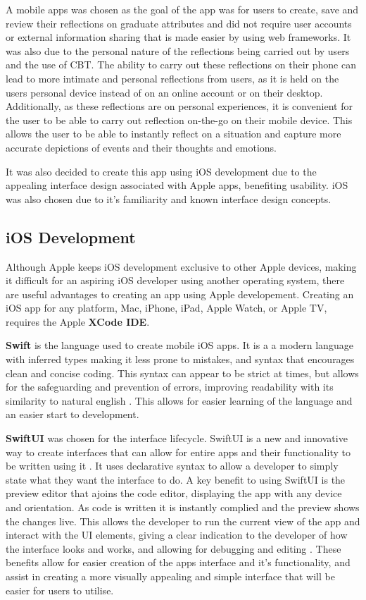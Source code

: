 \documentclass{l4proj}
\begin{document}
A mobile apps was chosen as the goal of the app was for users to create, save and review their reflections on graduate attributes and did not require user accounts or external information sharing that is made easier by using web frameworks. It was also due to the personal nature of the reflections being carried out by users and the use of CBT. The ability to carry out these reflections on their phone can lead to more intimate and personal reflections from users, as it is held on the users personal device instead of on an online account or on their desktop. Additionally, as these reflections are on personal experiences, it is convenient for the user to be able to carry out reflection on-the-go on their mobile device. This allows the user to be able to instantly reflect on a situation and capture more accurate depictions of events and their thoughts and emotions. 

It was also decided to create this app using iOS development due to the appealing interface design associated with Apple apps, benefiting usability. iOS was also chosen due to it's familiarity and known interface design concepts.

\subsection{iOS Development}

Although Apple keeps iOS development exclusive to other Apple devices, making it difficult for an aspiring iOS developer using another operating system, there are useful advantages to creating an app using Apple developement. Creating an iOS app for any platform, Mac, iPhone, iPad, Apple Watch, or Apple TV, requires the Apple \textbf{XCode IDE}. 

\textbf{Swift} is the language used to create mobile iOS apps. It is a a modern language with inferred types making it less prone to mistakes, and syntax that encourages clean and concise coding. This syntax can appear to be strict at times, but allows for the safeguarding and prevention of errors, improving readability with its similarity to natural english \citep{altexsoft_swift_2021}. This allows for easier learning of the language and an easier start to development.

\textbf{SwiftUI} was chosen for the interface lifecycle. SwiftUI is a new and innovative way to create interfaces that can allow for entire apps and their functionality to be written using it \citep{apple_developer_xcode_2021}. It uses declarative syntax to allow a developer to simply state what they want the interface to do. A key benefit to using SwiftUI is the preview editor that ajoins the code editor, displaying the app with any device and orientation. As code is written it is instantly complied and the preview shows the changes live. This allows the developer to run the current view of the app and interact with the UI elements, giving a clear indication to the developer of how the interface looks and works, and allowing for debugging and editing \citep{apple_swiftui_2021}. These benefits allow for easier creation of the apps interface and it's functionality, and assist in creating a more visually appealing and simple interface that will be easier for users to utilise.
\end{document}
